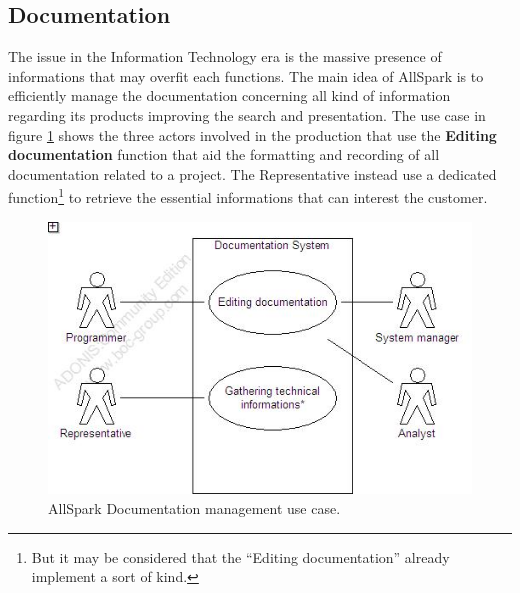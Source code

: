 \subsection{Documentation}
The issue in the Information Technology era is the massive presence of informations that may overfit each functions. The main idea of AllSpark is to efficiently manage the documentation concerning all kind of information regarding its products improving the search and presentation. The use case in figure \ref{3img:[use]documentation} shows the three actors involved in the production that use the \textbf{Editing documentation} function that aid the formatting and recording of all documentation related to a project. The Representative instead use a dedicated function\footnote{But it may be considered that the ``Editing documentation'' already implement a sort of kind.} to retrieve the essential informations that can interest the customer.

\begin{figure}
\begin{centering}
\includegraphics[scale=0.45]{assign3/adonis/imgs/documentation.jpg}
\caption{AllSpark Documentation management use case.}
\label{3img:[use]documentation}
\end{centering}
\end{figure}